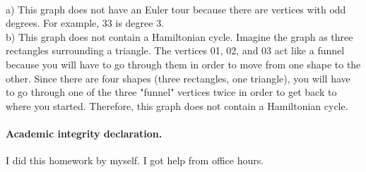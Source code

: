 \documentclass{article}
\begin{document}
\begin{solution}\\	
	a) This graph does not have an Euler tour because there are vertices with odd degrees. For example, 33 is degree 3.
	\\
	b) This graph does not contain a Hamiltonian cycle. Imagine the graph as three rectangles surrounding a triangle. The vertices 01, 02, and 03 act like a funnel because you will have to go through them in order to move from one shape to the other. Since there are four shapes (three rectangles, one triangle), you will have to go through one of the three "funnel" vertices twice in order to get back to where you started. Therefore, this graph does not contain a Hamiltonian cycle.
	\\
\end{solution}


\newpage

\paragraph{Academic integrity declaration.}

I did this homework by myself. I got help from office hours.


\end{document}
